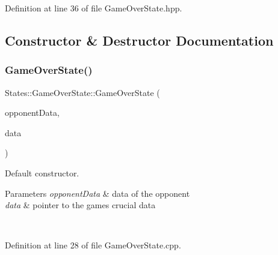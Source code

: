 \begin{DoxyVerb}\end{DoxyVerb}
 

Definition at line 36 of file Game\+Over\+State.\+hpp.



\subsection{Constructor \& Destructor Documentation}
\mbox{\label{class_states_1_1_game_over_state_a5f860ecbc86851a222086251b76d6067}} 
\subsubsection{\texorpdfstring{GameOverState()}{GameOverState()}}
{\footnotesize\ttfamily States\+::\+Game\+Over\+State\+::\+Game\+Over\+State (\begin{DoxyParamCaption}\item[{\mbox{\hyperlink{struct_arktis_engine_1_1_user_data}{Arktis\+Engine\+::\+User\+Data}}}]{opponent\+Data,  }\item[{\mbox{\hyperlink{namespace_arktis_engine_a52e783ae007274e2a6eccc201d9400a5}{Arktis\+Engine\+::\+Game\+Data\+Ref}}}]{data }\end{DoxyParamCaption})}



Default constructor. 


\begin{DoxyParams}{Parameters}
{\em opponent\+Data} & data of the opponent\\
\hline
{\em data} & pointer to the game\textquotesingle{}s crucial data \begin{DoxyVerb}\end{DoxyVerb}
 \\
\hline
\end{DoxyParams}


Definition at line 28 of file Game\+Over\+State.\+cpp.


\begin{DoxyCode}{0}

\end{DoxyCode}



